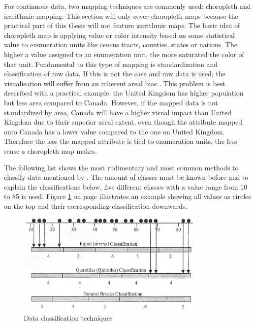 For continuous data, two mapping techniques are commonly used: choropleth and isarithmic mapping. This section will only cover choropleth maps because the practical part of this thesis will not feature isarithmic maps. The basic idea of choropleth map is applying value or color intensity based on some statistical value to enumeration units like census tracts, counties, states or nations. The higher a value assigned to an enumeration unit, the more saturated the color of that unit. Fundamental to this type of mapping is standardization and classification of raw data. If this is not the case and raw data is used, the visualisation will suffer from an inherent areal bias . This problem is best described with a practical example: the United Kingdom has higher population but less area compared to Canada. However, if the mapped data is not standardized by area, Canada will have a higher visual impact than United Kingdom due to their superior areal extent, even though the attribute mapped onto Canada has a lower value compared to the one on United Kingdom. Therefore the less the mapped attribute is tied to enumeration units, the less sense a choropleth map makes.

The following list shows the most rudimentary and most common methods to classify data mentioned by \citeauthor{McMaster2010}. The amount of classes must be known before and to explain the classifications below, five different classes with a value range from 10 to 85 is used. Figure \ref{fig:choropleth-classification} on page \pageref{fig:choropleth-classification} illustrates an example showing all values as circles on the top and their corresponding classification downwards.

\begin{figure}[!htb]
\centering
\includegraphics[height=5cm,keepaspectratio]{images/choropleth/classification.png}
\caption[
    Data classification techniques .
]{Data classification techniques}
\label{fig:choropleth-classification}
\end{figure}

